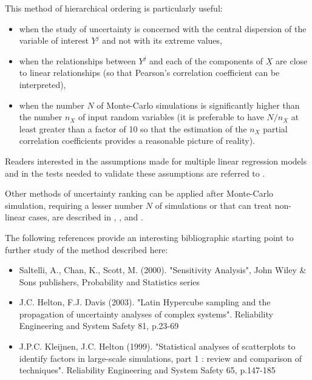 {
  This method of hierarchical ordering is particularly useful:
  \begin{itemize}
  \item when the study of uncertainty is concerned with the central dispersion of the variable of interest $Y^j$ and not with its extreme values,
  \item when the relationships between $Y^j$ and each of the components of $\underline{X}$ are close to linear relationships (so that Pearson's correlation coefficient can be interpreted),
  \item when the number $N$ of Monte-Carlo simulations is significantly higher than the number $n_X$ of input random variables (it is preferable to have $N/n_X$ at least greater than a factor of 10 so that the estimation of the $n_X$ partial correlation coefficients provides a reasonable picture of reality).
  \end{itemize}

  Readers interested in the assumptions made for multiple linear regression models and in the tests needed to validate these assumptions are referred to .

  Other methods of uncertainty ranking can be applied after Monte-Carlo simulation, requiring a lesser number $N$ of simulations or that can treat non-linear cases, are described in , , and .

  The following references provide an interesting bibliographic starting point to further study of the method described here:
  \begin{itemize}
  \item Saltelli, A., Chan, K., Scott, M. (2000). "Sensitivity Analysis", John Wiley \& Sons publishers, Probability and Statistics series
  \item J.C. Helton, F.J. Davis (2003). "Latin Hypercube sampling and the propagation of uncertainty analyses of complex systems". Reliability Engineering and System Safety 81, p.23-69
  \item J.P.C. Kleijnen, J.C. Helton (1999). "Statistical analyses of scatterplots to identify factors in large-scale simulations, part 1 : review and comparison of techniques". Reliability Engineering and System Safety 65, p.147-185
  \end{itemize}
}

